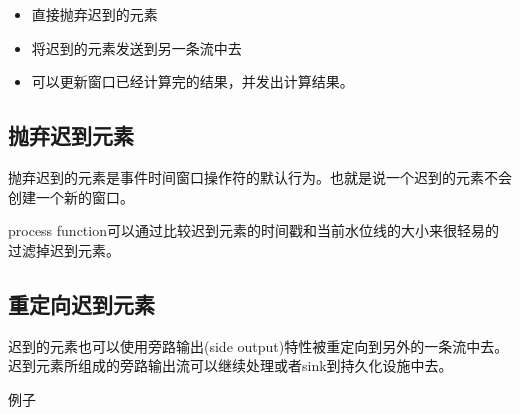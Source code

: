 \documentclass[cn,11pt,chinese]{elegantbook}
\providecommand{\tightlist}{%
  \setlength{\itemsep}{0pt}\setlength{\parskip}{0pt}}
\begin{document}
\begin{itemize}
\tightlist
\item
  直接抛弃迟到的元素
\item
  将迟到的元素发送到另一条流中去
\item
  可以更新窗口已经计算完的结果，并发出计算结果。
\end{itemize}

\hypertarget{ux629bux5f03ux8fdfux5230ux5143ux7d20}{%
\subsection{抛弃迟到元素}\label{ux629bux5f03ux8fdfux5230ux5143ux7d20}}

抛弃迟到的元素是事件时间窗口操作符的默认行为。也就是说一个迟到的元素不会创建一个新的窗口。

process
function可以通过比较迟到元素的时间戳和当前水位线的大小来很轻易的过滤掉迟到元素。

\hypertarget{ux91cdux5b9aux5411ux8fdfux5230ux5143ux7d20}{%
\subsection{重定向迟到元素}\label{ux91cdux5b9aux5411ux8fdfux5230ux5143ux7d20}}

迟到的元素也可以使用旁路输出(side
output)特性被重定向到另外的一条流中去。迟到元素所组成的旁路输出流可以继续处理或者sink到持久化设施中去。

例子
\end{document}
